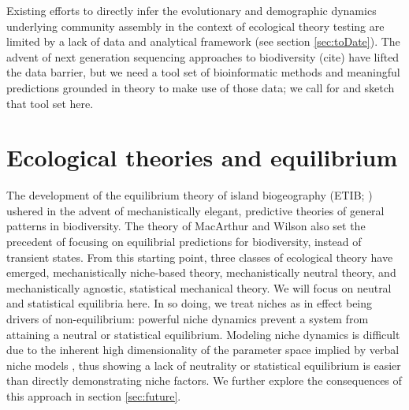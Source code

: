 \documentclass[12pt]{article}
\begin{document}


Existing efforts to directly infer the evolutionary and demographic
dynamics underlying community assembly in the context of ecological
theory testing are limited by a lack of data and analytical framework
(see section \ref{sec:toDate}).  The advent of next generation
sequencing approaches to biodiversity (cite) have lifted the data
barrier, but we need a tool set of bioinformatic methods and
meaningful predictions grounded in theory to make use of those data;
we call for and sketch that tool set here.


\section{Ecological theories and equilibrium}

The development of the equilibrium theory of island biogeography
(ETIB; \citep{MacArthur1967-ux}) ushered in the advent of
mechanistically elegant, predictive theories of general patterns in
biodiversity. The theory of MacArthur and Wilson also set the
precedent of focusing on equilibrial predictions for biodiversity,
instead of transient states. From this starting point, three classes
of ecological theory have emerged, mechanistically niche-based theory,
mechanistically neutral theory, and mechanistically agnostic,
statistical mechanical theory. We will focus on neutral and
statistical equilibria here. In so doing, we treat niches as in effect
being drivers of non-equilibrium: powerful niche dynamics prevent a
system from attaining a neutral or statistical equilibrium.  Modeling
niche dynamics is difficult due to the inherent high dimensionality of
the parameter space implied by verbal niche models
\citep[e.g.,][]{hutch}, thus showing a lack of neutrality or
statistical equilibrium is easier than directly demonstrating niche
factors. We further explore the consequences of this approach in
section \ref{sec:future}.
\end{document}
